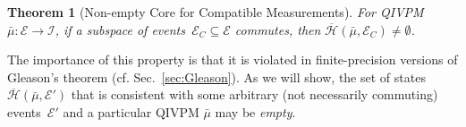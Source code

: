 \documentclass[english,reprint, aps, prl,superscriptaddress, showpacs,
showkeys, longbibliography, amsmath, amssymb, floatfix]{revtex4-1}
\theoremstyle{plain}
\newtheorem{thm}{Theorem}
\theoremstyle{definition}
\newcommand{\Hilb}{\mathcal{H}}
\newcommand{\events}{\ensuremath{\mathcal{E}}}
\newcommand{\imposs}{{\text{\wesa{impossible}}}}
\newcommand{\necess}{{\text{\wesa{certain}}}}
\newcommand{\unknown}{{\text{\wesa{unknown}}}}
\newcommand{\proj}[1]{\op{#1}{#1}}
\newcommand{\coreBorn}{\ensuremath{\overline{\Hilb}}}
\newcommand{\eventsC}{\ensuremath{\events_{C}}}
\begin{document}
\begin{thm}[Non-empty Core for Compatible Measurements] \label{thm:Shapley}
  For QIVPM~$\bar{\mu}:\events\rightarrow\mathscr{I}$, if a subspace
  of events~$\eventsC\subseteq\events$ commutes, then
  $\coreBorn\left(\bar{\mu},\eventsC\right)\ne\emptyset$.
\end{thm}

The importance of this property is that it is violated in
finite-precision versions of Gleason's theorem
(cf. Sec.~\ref{sec:Gleason}). As we will show, the set of states
$\coreBorn\left(\bar{\mu},\events'\right)$ that is consistent with
some arbitrary (not necessarily commuting) events~$\events'$ and a
particular QIVPM $\bar{\mu}$ may be \emph{empty}.

\end{document}
